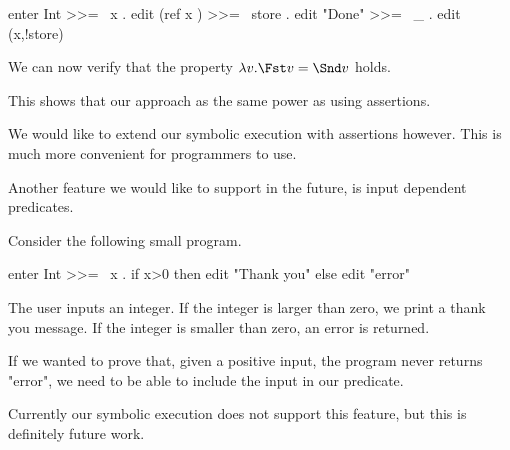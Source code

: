 \begin{TASK}
  enter Int >>= \ x . edit (ref x ) >>= \ store . edit "Done" >>= \ _ . edit (x,!store)
\end{TASK}

We can now verify that the property $\lambda v . \Fst v = \Snd v$ holds.

This shows that our approach as the same power as using assertions.

We would like to extend our symbolic execution with assertions however.
This is much more convenient for programmers to use.

Another feature we would like to support in the future, is input dependent predicates.

\begin{example}
  Consider the following small program.

  \begin{TASK}
    enter Int >>= \ x . if x>0 then edit "Thank you" else edit "error"
  \end{TASK}

  The user inputs an integer.
  If the integer is larger than zero, we print a thank you message.
  If the integer is smaller than zero, an error is returned.

  If we wanted to prove that, given a positive input, the program never returns "error", we need to be able to include the input in our predicate.
\end{example}

Currently our symbolic execution does not support this feature, but this is definitely future work.
